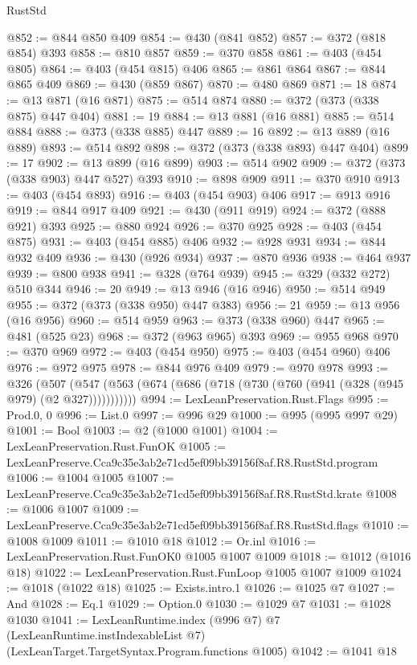 \begin{lexlean}{RustStd}
\begin{coremodule}
@852 := @844 @850 @409
@854 := @430 (@841 @852)
@857 := @372 (@818 @854) @393
@858 := @810 @857
@859 := @370 @858
@861 := @403 (@454 @805)
@864 := @403 (@454 @815) @406
@865 := @861 @864
@867 := @844 @865 @409
@869 := @430 (@859 @867)
@870 := @480 @869
@871 := 18
@874 := @13 @871 (@16 @871)
@875 := @514 @874
@880 := @372 (@373 (@338 @875) @447 @404)
@881 := 19
@884 := @13 @881 (@16 @881)
@885 := @514 @884
@888 := @373 (@338 @885) @447
@889 := 16
@892 := @13 @889 (@16 @889)
@893 := @514 @892
@898 := @372 (@373 (@338 @893) @447 @404)
@899 := 17
@902 := @13 @899 (@16 @899)
@903 := @514 @902
@909 := @372 (@373 (@338 @903) @447 @527) @393
@910 := @898 @909
@911 := @370 @910
@913 := @403 (@454 @893)
@916 := @403 (@454 @903) @406
@917 := @913 @916
@919 := @844 @917 @409
@921 := @430 (@911 @919)
@924 := @372 (@888 @921) @393
@925 := @880 @924
@926 := @370 @925
@928 := @403 (@454 @875)
@931 := @403 (@454 @885) @406
@932 := @928 @931
@934 := @844 @932 @409
@936 := @430 (@926 @934)
@937 := @870 @936
@938 := @464 @937
@939 := @800 @938
@941 := @328 (@764 @939)
@945 := @329 (@332 @272) @510 @344
@946 := 20
@949 := @13 @946 (@16 @946)
@950 := @514 @949
@955 := @372 (@373 (@338 @950) @447 @383)
@956 := 21
@959 := @13 @956 (@16 @956)
@960 := @514 @959
@963 := @373 (@338 @960) @447
@965 := @481 (@525 @23)
@968 := @372 (@963 @965) @393
@969 := @955 @968
@970 := @370 @969
@972 := @403 (@454 @950)
@975 := @403 (@454 @960) @406
@976 := @972 @975
@978 := @844 @976 @409
@979 := @970 @978
@993 := @326
    (@507 (@547 (@563 (@674 (@686 (@718 (@730 (@760 (@941 (@328 (@945 @979) (@2 @327)))))))))))
@994 := LexLeanPreservation.Rust.Flags
@995 := Prod.{0, 0}
@996 := List.{0}
@997 := @996 @29
@1000 := @995 (@995 @997 @29)
@1001 := Bool
@1003 := @2 (@1000 @1001)
@1004 := LexLeanPreservation.Rust.FunOK
@1005 := LexLeanPreserve.Cca9c35e3ab2e71cd5ef09bb39156f8af.R8.RustStd.program
@1006 := @1004 @1005
@1007 := LexLeanPreserve.Cca9c35e3ab2e71cd5ef09bb39156f8af.R8.RustStd.krate
@1008 := @1006 @1007
@1009 := LexLeanPreserve.Cca9c35e3ab2e71cd5ef09bb39156f8af.R8.RustStd.flags
@1010 := @1008 @1009
@1011 := @1010 @18
@1012 := Or.inl
@1016 := LexLeanPreservation.Rust.FunOK0 @1005 @1007 @1009
@1018 := @1012 (@1016 @18)
@1022 := LexLeanPreservation.Rust.FunLoop @1005 @1007 @1009
@1024 := @1018 (@1022 @18)
@1025 := Exists.intro.{1}
@1026 := @1025 @7
@1027 := And
@1028 := Eq.{1}
@1029 := Option.{0}
@1030 := @1029 @7
@1031 := @1028 @1030
@1041 := LexLeanRuntime.index
    (@996 @7)
    @7
    (LexLeanRuntime.instIndexableList @7)
    (LexLeanTarget.TargetSyntax.Program.functions @1005)
@1042 := @1041 @18

\end{coremodule}
\end{lexlean}
